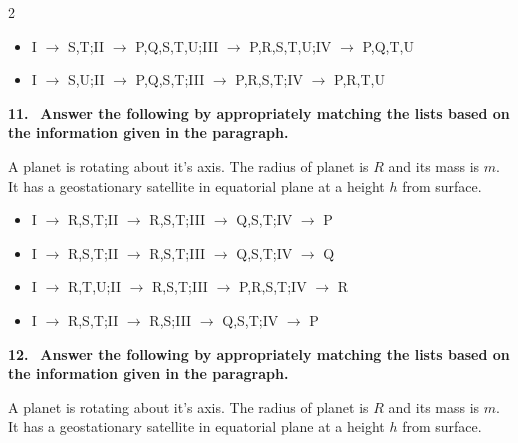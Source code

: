 \documentclass[10pt]{extarticle}
\newcommand{\qn}[1]{\par\smallskip\noindent\textbf{#1.}~}
\newenvironment{qoptions}{\begin{itemize}[leftmargin=1.8em,itemsep=1pt,topsep=2pt,label={}]}{\end{itemize}}
\newcommand{\opt}[2]{\item[(#1)] #2}
\begin{document}
\begin{multicols}{2}
\begin{qoptions}
\opt{C}{I $\to$ S,T;II $\to$ P,Q,S,T,U;III $\to$ P,R,S,T,U;IV $\to$ P,Q,T,U}
\opt{D}{I $\to$ S,U;II $\to$ P,Q,S,T;III $\to$ P,R,S,T;IV $\to$ P,R,T,U}
\end{qoptions}
\qn{11} \textbf{Answer the following by appropriately matching the lists based on the information given in the paragraph.}\par
A planet is rotating about it's axis. The radius of planet is $R$ and its mass is $m$. It has a geostationary satellite in equatorial plane at a height $h$ from surface.\par
\smallskip
{}
\begin{qoptions}
\opt{A}{I $\to$ R,S,T;II $\to$ R,S,T;III $\to$ Q,S,T;IV $\to$ P}
\opt{B}{I $\to$ R,S,T;II $\to$ R,S,T;III $\to$ Q,S,T;IV $\to$ Q}
\opt{C}{I $\to$ R,T,U;II $\to$ R,S,T;III $\to$ P,R,S,T;IV $\to$ R}
\opt{D}{I $\to$ R,S,T;II $\to$ R,S;III $\to$ Q,S,T;IV $\to$ P}
\end{qoptions}
\qn{12} \textbf{Answer the following by appropriately matching the lists based on the information given in the paragraph.}\par
A planet is rotating about it's axis. The radius of planet is $R$ and its mass is $m$. It has a geostationary satellite in equatorial plane at a height $h$ from surface.\par

\end{multicols}
\end{document}
